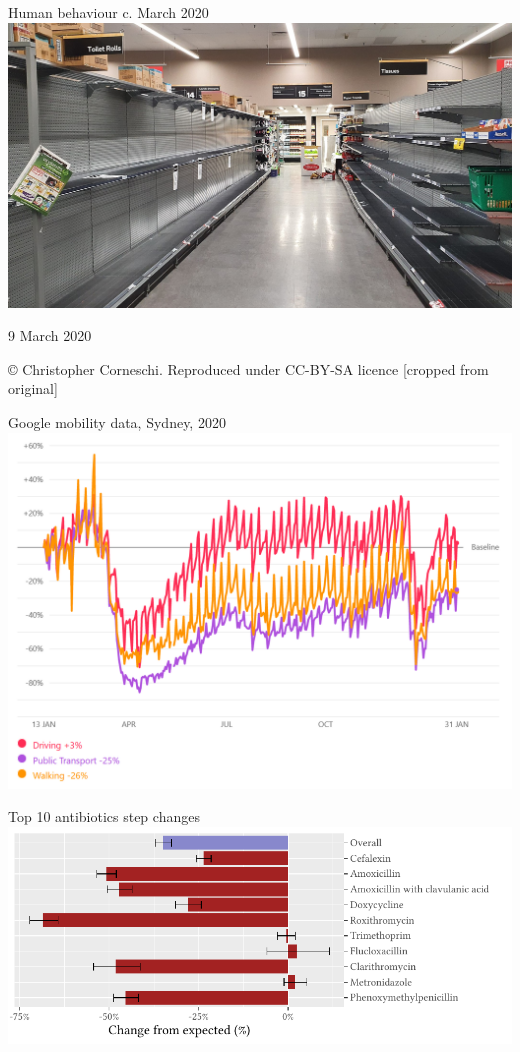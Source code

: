 \documentclass[aspectratio=169,12pt]{beamer} %
\begin{document}
\begin{frame}{Human behaviour c. March 2020}
\centering
\includegraphics[height=0.75\textheight]
	{ref/toilet-paper-crop.jpg}

	\tiny 9 March 2020

	\copyright\: Christopher Corneschi.
	Reproduced under CC-BY-SA licence [cropped from original]
\end{frame}

\begin{frame}{Google mobility data, Sydney, 2020}
\centering
\includegraphics[height=0.8\textheight]
        {ref/google-mobility-20210202.PNG}
\end{frame}

\begin{frame}{Top 10 antibiotics step changes}
\centering
\includegraphics{ref/latex-j01arimatab-1.pdf}
\end{frame}
\end{document}
